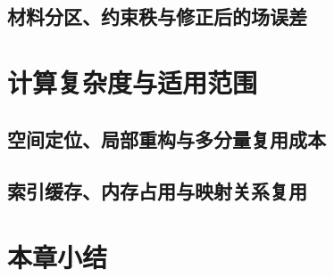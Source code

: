 \subsection{材料分区、约束秩与修正后的场误差}
\thesisdraftnote

\section{计算复杂度与适用范围}
\subsection{空间定位、局部重构与多分量复用成本}
\thesisdraftnote

\subsection{索引缓存、内存占用与映射关系复用}
\thesisdraftnote

\section{本章小结}
\thesisdraftnote

